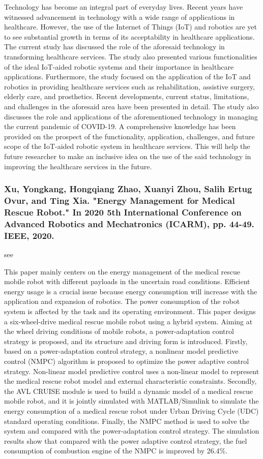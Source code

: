 \documentclass[conference]{IEEEtran}
\begin{document}
Technology has become an integral part of everyday lives. Recent years have witnessed advancement in technology with a wide range of applications in healthcare. However, the use of the Internet of Things (IoT) and robotics are yet to see substantial growth in terms of its acceptability in healthcare applications. The current study has discussed the role of the aforesaid technology in transforming healthcare services. The study also presented various functionalities of the ideal IoT-aided robotic systems and their importance in healthcare applications. Furthermore, the study focused on the application of the IoT and robotics in providing healthcare services such as rehabilitation, assistive surgery, elderly care, and prosthetics. Recent developments, current status, limitations, and challenges in the aforesaid area have been presented in detail. The study also discusses the role and applications of the aforementioned technology in managing the current pandemic of COVID-19. A comprehensive knowledge has been provided on the prospect of the functionality, application, challenges, and future scope of the IoT-aided robotic system in healthcare services. This will help the future researcher to make an inclusive idea on the use of the said technology in improving the healthcare services in the future.

\medskip
\subsubsection{Xu, Yongkang, Hongqiang Zhao, Xuanyi Zhou, Salih Ertug Ovur, and Ting Xia. "Energy Management for Medical Rescue Robot." In 2020 5th International Conference on Advanced Robotics and Mechatronics (ICARM), pp. 44-49. IEEE, 2020.}
see \cite{xu2020energy}

This paper mainly centers on the energy management of the medical rescue mobile robot with different payloads in the uncertain road conditions. Efficient energy usage is a crucial issue because energy consumption will increase with the application and expansion of robotics. The power consumption of the robot system is affected by the task and its operating environment. This paper designs a six-wheel-drive medical rescue mobile robot using a hybrid system. Aiming at the wheel driving conditions of mobile robots, a power-adaptation control strategy is proposed, and its structure and driving form is introduced. Firstly, based on a power-adaptation control strategy, a nonlinear model predictive control (NMPC) algorithm is proposed to optimize the power adaptive control strategy. Non-linear model predictive control uses a non-linear model to represent the medical rescue robot model and external characteristic constraints. Secondly, the AVL CRUISE module is used to build a dynamic model of a medical rescue mobile robot, and it is jointly simulated with MATLAB/Simulink to simulate the energy consumption of a medical rescue robot under Urban Driving Cycle (UDC) standard operating conditions. Finally, the NMPC method is used to solve the system and compared with the power-adaptation control strategy. The simulation results show that compared with the power adaptive control strategy, the fuel consumption of combustion engine of the NMPC is improved by 26.4\%.
\end{document}
